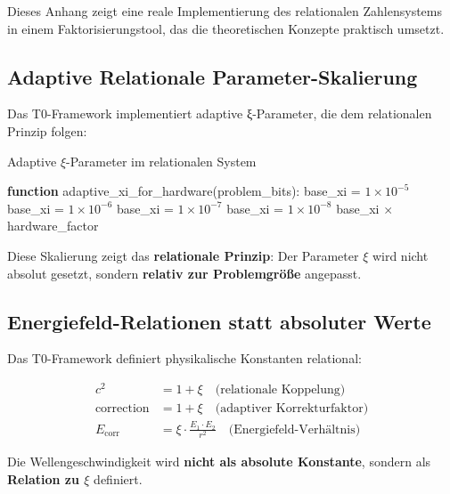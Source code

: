 \documentclass[11pt,a4paper]{article}
\begin{document}
	Dieses Anhang zeigt eine reale Implementierung des relationalen Zahlensystems in einem Faktorisierungstool, das die theoretischen Konzepte praktisch umsetzt.
	
	\subsection{Adaptive Relationale Parameter-Skalierung}
	
	Das T0-Framework implementiert adaptive ξ-Parameter, die dem relationalen Prinzip folgen:
	
	\begin{algorithm}[htbp]
		\caption{Adaptive $\xi$-Parameter im relationalen System}
		\label{alg:adaptive_xi}
		\begin{algorithmic}[1]
			\STATE \textbf{function} adaptive\_xi\_for\_hardware(problem\_bits):
			\STATE base\_xi = $1 \times 10^{-5}$ 
			\STATE base\_xi = $1 \times 10^{-6}$ 
			\STATE base\_xi = $1 \times 10^{-7}$ 
			\ELSE
			\STATE base\_xi = $1 \times 10^{-8}$ 
			\ENDIF
			\RETURN base\_xi $\times$ hardware\_factor
		\end{algorithmic}
	\end{algorithm}
	
	Diese Skalierung zeigt das \textbf{relationale Prinzip}: Der Parameter $\xi$ wird nicht absolut gesetzt, sondern \textbf{relativ zur Problemgröße} angepasst.
	
	\subsection{Energiefeld-Relationen statt absoluter Werte}
	
	Das T0-Framework definiert physikalische Konstanten relational:
	
	\begin{align}
		c^2 &= 1 + \xi \quad \text{(relationale Koppelung)} \\
		\text{correction} &= 1 + \xi \quad \text{(adaptiver Korrekturfaktor)} \\
		E_{\text{corr}} &= \xi \cdot \frac{E_1 \cdot E_2}{r^2} \quad \text{(Energiefeld-Verhältnis)}
	\end{align}
	
	Die Wellengeschwindigkeit wird \textbf{nicht als absolute Konstante}, sondern als \textbf{Relation zu $\xi$} definiert.
	
\end{document}
